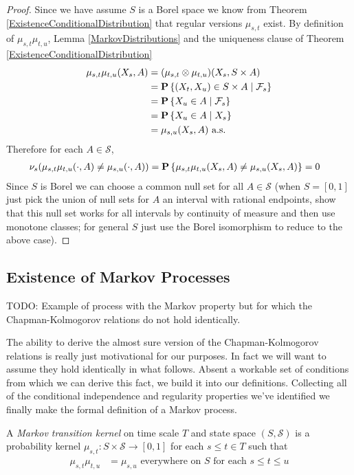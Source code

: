 \begin{proof}
Since we have assume $S$ is a Borel space we know from Theorem \ref{ExistenceConditionalDistribution} that regular
versions $\mu_{s,t}$ exist.  By definition of $\mu_{s,t} \mu_{t,u}$, Lemma
\ref{MarkovDistributions} and the uniqueness clause of Theorem \ref{ExistenceConditionalDistribution}
\begin{align*}
\mu_{s,t} \mu_{t,u}(X_s, A) &= 
(\mu_{s,t} \otimes \mu_{t,u})(X_s, S \times A) \\
&= \cprobability{\mathcal{F}_s}{(X_t, X_u) \in S \times A} \\
&=\cprobability{\mathcal{F}_s}{ X_u \in A} \\
&=\cprobability{X_s}{ X_u \in A} \\
&= \mu_{s,u}(X_s, A) \text{  a.s.}
\end{align*}
Therefore for each $A \in \mathcal{S}$,
\begin{align*}
\nu_s(\mu_{s,t} \mu_{t,u} (\cdot, A) \neq \mu_{s,u}(\cdot, A)) &= \probability{\mu_{s,t} \mu_{t,u}(X_s, A) \neq \mu_{s,u}(X_s, A)} = 0
\end{align*}
Since $S$ is Borel we can choose a common null set for all $A \in \mathcal{S}$ (when $S=[0,1]$ just pick the union of null sets for $A$ an
interval with rational endpoints, show that this null set works for all intervals by continuity of measure and then use monotone classes; for general $S$ just
use the Borel isomorphism to reduce to the above case).
\end{proof}

\subsection{Existence of Markov Processes}

TODO: Example of process with the Markov property but for which the Chapman-Kolmogorov relations do not hold identically.

The ability to derive the almost sure version of the
Chapman-Kolmogorov relations is really just motivational for our
purposes.  In fact we will want to assume they hold identically in
what follows.  Absent a workable set of conditions from which we can
derive this fact, we build it into our definitions.  Collecting all of
the conditional independence and regularity properties we've
identified we finally make the formal definition of a Markov process.
\begin{defn}A \emph{Markov transition kernel} on time scale $T$ and 
state space $(S, \mathcal{S})$ is a probability  kernel $\mu_{s,t} : S \times \mathcal{S} \to [0,1]$ 
for each $s \leq t \in T$ such that 
\begin{align*}
\mu_{s,t} \mu_{t,u} &= \mu_{s,u}  \text{ everywhere on $S$ for  each $s \leq t \leq u$}
\end{align*}
\end{defn}

